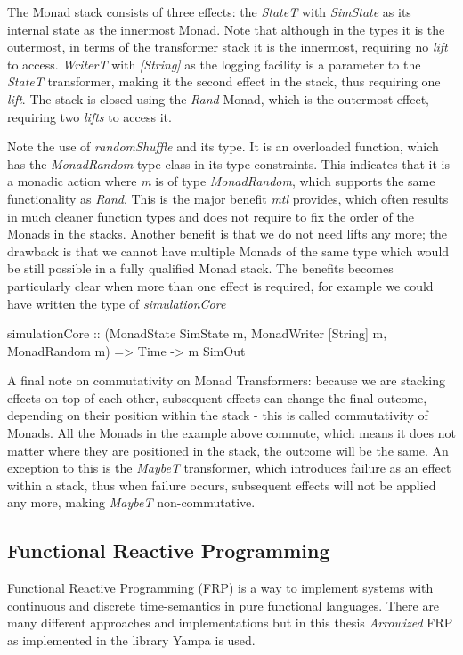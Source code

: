 The Monad stack consists of three effects: the \textit{StateT} with \textit{SimState} as its internal state as the innermost Monad. Note that although in the types it is the outermost, in terms of the transformer stack it is the innermost, requiring no \textit{lift} to access. \textit{WriterT} with \textit{[String]} as the logging facility is a parameter to the \textit{StateT} transformer, making it the second effect in the stack, thus requiring one \textit{lift}. The stack is closed using the \textit{Rand} Monad, which is the outermost effect, requiring two \textit{lifts} to access it.

Note the use of \textit{randomShuffle} and its type. It is an overloaded function, which has the \textit{MonadRandom} type class in its type constraints. This indicates that it is a monadic action where \textit{m} is of type \textit{MonadRandom}, which supports the same functionality as \textit{Rand}. This is the major benefit \textit{mtl} provides, which often results in much cleaner function types and does not require to fix the order of the Monads in the stacks. Another benefit is that we do not need lifts any more; the drawback is that we cannot have multiple Monads of the same type which would be still possible in a fully qualified Monad stack. The benefits becomes particularly clear when more than one effect is required, for example we could have written the type of \textit{simulationCore}

\begin{HaskellCode}
simulationCore :: (MonadState SimState m, MonadWriter [String] m, MonadRandom m) 
               => Time -> m SimOut
\end{HaskellCode}

A final note on commutativity on Monad Transformers: because we are stacking effects on top of each other, subsequent effects can change the final outcome, depending on their position within the stack - this is called commutativity of Monads. All the Monads in the example above commute, which means it does not matter where they are positioned in the stack, the outcome will be the same. An exception to this is the \textit{MaybeT} transformer, which introduces failure as an effect within a stack, thus when failure occurs, subsequent effects will not be applied any more, making \textit{MaybeT} non-commutative. 

\subsection{Functional Reactive Programming}
\label{sec:back_frp}
Functional Reactive Programming (FRP) is a way to implement systems with continuous and discrete time-semantics in pure functional languages. There are many different approaches and implementations but in this thesis \textit{Arrowized} FRP \cite{hughes_generalising_2000, hughes_programming_2005} as implemented in the library Yampa \cite{courtney_yampa_2003,hudak_arrows_2003,nilsson_functional_2002} is used.

